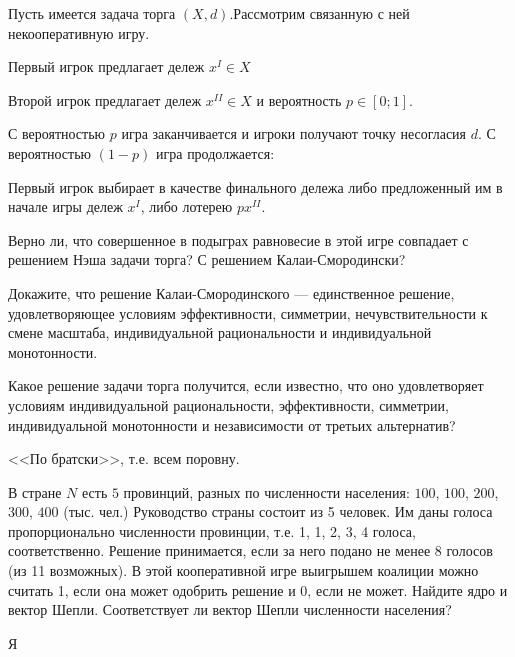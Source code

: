 \begin{problem}
 Пусть имеется задача торга $(X,d).$Рассмотрим связанную
с ней некооперативную игру.

Первый игрок предлагает дележ $x^{I}\in X$

Второй игрок предлагает дележ $x^{II}\in X$ и вероятность $p\in[0;1]$.

С вероятностью $p$ игра заканчивается и игроки получают точку несогласия
$d$. С вероятностью $(1-p)$ игра продолжается:

Первый игрок выбирает в качестве финального дележа либо предложенный
им в начале игры дележ $x^{I}$, либо лотерею $px^{II}$.

Верно ли, что совершенное в подыграх равновесие в этой игре совпадает
с решением Нэша задачи торга? С решением Калаи-Смородински?



\begin{sol}

\end{sol}
\end{problem}



\begin{problem}
Докажите, что решение Калаи-Смородинского --- единственное
решение, удовлетворяющее условиям эффективности, симметрии, нечувствительности
к смене масштаба, индивидуальной рациональности и индивидуальной монотонности.



\begin{sol}

\end{sol}
\end{problem}



\begin{problem}
Какое решение задачи торга получится, если известно, что оно удовлетворяет
условиям индивидуальной рациональности, эффективности, симметрии,
индивидуальной монотонности и независимости от третьих альтернатив?



\begin{sol}
<<По братски>>, т.е. всем поровну.
\end{sol}
\end{problem}

\begin{problem}
В стране $N$ есть $5$ провинций, разных по численности населения: $100$, $100$, $200$, $300$, $400$ (тыс. чел.) Руководство страны состоит из 5 человек. Им даны голоса пропорционально
численности провинции, т.е. 1, 1, 2, 3, 4 голоса, соответственно. Решение принимается,
если за него подано не менее 8 голосов (из 11 возможных). В этой кооперативной игре
выигрышем коалиции можно считать 1, если она может одобрить решение и 0, если не
может. Найдите ядро и вектор Шепли. Соответствует ли вектор Шепли численности населения?

\begin{sol}
Я\end{sol}


\end{problem}

